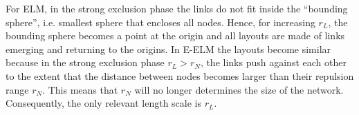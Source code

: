 \documentclass[nofootinbib,preprint,floatfix,endfloats]{revtex4} %
\begin{document}
For ELM, %
in the strong exclusion phase the links do not fit inside the ``bounding sphere'', i.e. smallest sphere that encloses all nodes. 
Hence, for increasing $r_L$, the bounding sphere becomes a point at the origin and all layouts are made of links emerging and returning to the origins. 
In E-ELM the layouts become similar because in the strong exclusion phase $r_L > r_N$, the links push against each other to the extent that the distance between nodes becomes larger than their repulsion range $r_N$. This means that $r_N$ will no longer determines the size of the network. Consequently, the only relevant length scale is $r_L$.
%
% 
\end{document}
